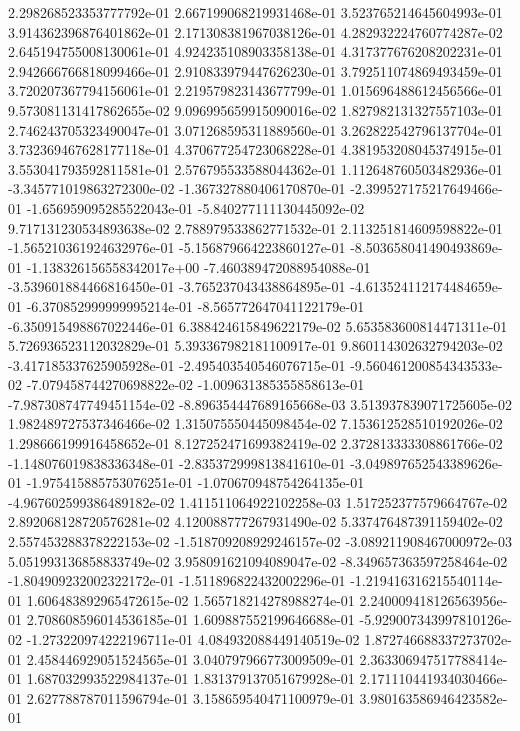 2.298268523353777792e-01
2.667199068219931468e-01
3.523765214645604993e-01
3.914362396876401862e-01
2.171308381967038126e-01
4.282932224760774287e-02
2.645194755008130061e-01
4.924235108903358138e-01
4.317377676208202231e-01
2.942666766818099466e-01
2.910833979447626230e-01
3.792511074869493459e-01
3.720207367794156061e-01
2.219579823143677799e-01
1.015696488612456566e-01
9.573081131417862655e-02
9.096995659915090016e-02
1.827982131327557103e-01
2.746243705323490047e-01
3.071268595311889560e-01
3.262822542796137704e-01
3.732369467628177118e-01
4.370677254723068228e-01
4.381953208045374915e-01
3.553041793592811581e-01
2.576795533588044362e-01
1.112648760503482936e-01
-3.345771019863272300e-02
-1.367327880406170870e-01
-2.399527175217649466e-01
-1.656959095285522043e-01
-5.840277111130445092e-02
9.717131230534893638e-02
2.788979533862771532e-01
2.113251814609598822e-01
-1.565210361924632976e-01
-5.156879664223860127e-01
-8.503658041490493869e-01
-1.138326156558342017e+00
-7.460389472088954088e-01
-3.539601884466816450e-01
-3.765237043438864895e-01
-4.613524112174484659e-01
-6.370852999999995214e-01
-8.565772647041122179e-01
-6.350915498867022446e-01
6.388424615849622179e-02
5.653583600814471311e-01
5.726936523112032829e-01
5.393367982181100917e-01
9.860114302632794203e-02
-3.417185337625905928e-01
-2.495403540546076715e-01
-9.560461200854343533e-02
-7.079458744270698822e-02
-1.009631385355858613e-01
-7.987308747749451154e-02
-8.896354447689165668e-03
3.513937839071725605e-02
1.982489727537346466e-02
1.315075550445098454e-02
7.153612528510192026e-02
1.298666199916458652e-01
8.127252471699382419e-02
2.372813333308861766e-02
-1.148076019838336348e-01
-2.835372999813841610e-01
-3.049897652543389626e-01
-1.975415885753076251e-01
-1.070670948754264135e-01
-4.967602599386489182e-02
1.411511064922102258e-03
1.517252377579664767e-02
2.892068128720576281e-02
4.120088777267931490e-02
5.337476487391159402e-02
2.557453288378222153e-02
-1.518709208929246157e-02
-3.089211908467000972e-03
5.051993136858833749e-02
3.958091621094089047e-02
-8.349657363597258464e-02
-1.804909232002322172e-01
-1.511896822432002296e-01
-1.219416316215540114e-01
1.606483892965472615e-02
1.565718214278988274e-01
2.240009418126563956e-01
2.708608596014536185e-01
1.609887552199646688e-01
-5.929007343997810126e-02
-1.273220974222196711e-01
4.084932088449140519e-02
1.872746688337273702e-01
2.458446929051524565e-01
3.040797966773009509e-01
2.363306947517788414e-01
1.687032993522984137e-01
1.831379137051679928e-01
2.171110441934030466e-01
2.627788787011596794e-01
3.158659540471100979e-01
3.980163586946423582e-01
